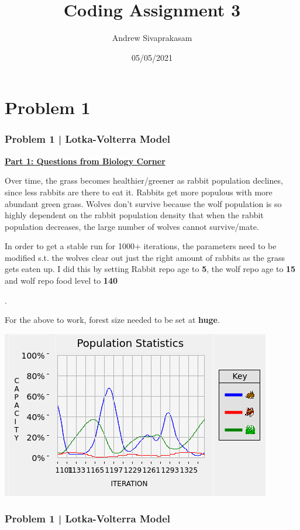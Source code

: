\documentclass[aspectratio=1610]{beamer}
\title{Coding Assignment 3}
\author[Andrew Sivaprakasam]{Andrew Sivaprakasam}
\date{05/05/2021}
\begin{document}
\frame{\titlepage}

\section{Problem 1}

\begin{frame}
\frametitle{Problem 1 | Lotka-Volterra Model}
\textbf{\underline{Part 1: Questions from Biology Corner}}
\begin{enumerate}
\item \footnotesize{Over time, the grass becomes healthier/greener as rabbit population declines, since less rabbits are there to eat it. Rabbits get more populous with more abundant green grass. Wolves don't survive because the wolf population is so highly dependent on the rabbit population density that when the rabbit population decreases, the large number of wolves cannot survive/mate. 
\item In order to get a stable run for 1000+ iterations, the parameters need to be modified s.t. the wolves clear out just the right amount of rabbits as the grass gets eaten up. I did this by setting Rabbit repo age to \textbf{5}, the wolf repo age to \textbf{15} and wolf repo food level to \textbf{140}}.

\item For the above to work, forest size needed to be set at \textbf{huge}.

\vspace{1em}
\centering
\includegraphics[width = .45\textwidth]{sim_1000} 
\end{enumerate}
\end{frame}


\begin{frame}
\frametitle{Problem 1 | Lotka-Volterra Model}

\end{frame}
\end{document}
